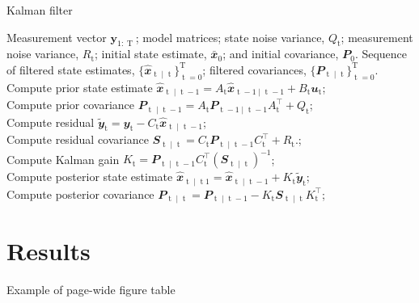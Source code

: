 \documentclass[twoside,twocolumn]{article}
\DeclareMathOperator{\td}{\mathrm{t}}
\DeclareMathOperator{\T}{\mathrm{T}}
\theoremstyle{mytheoremstyle}
\begin{document}
\begin{algorithm}[!t]
	\caption{Kalman filter}\label{alg:kf}
	\begin{algorithmic}[1]
		\renewcommand{\algorithmicrequire}{\textbf{Input:}}
		\renewcommand{\algorithmicensure}{\textbf{Output:}}
		\REQUIRE Measurement vector $\mathbf{y}_{1:\T}$; model matrices; state noise variance, $Q_{\td}$; measurement noise variance, $R_{\td}$; initial state estimate, $\bar{\mathbfit{x}}_0$; and initial covariance, $\mathbfit{P}_0$.
		\ENSURE Sequence of filtered state estimates, $\{\hat{\mathbfit{x}}_{\td \mid \td}\}^{\T}_{\td = 0}$; filtered covariances, $\{\mathbfit{P}_{\td \mid \td}\}^{\T}_{\td = 0}$.
		\FOR {$\td \gets 1,\T$}
		\STATE Compute prior state estimate $
		\hat{\mathbfit{x}}_{\td \mid \td-1} = A_{\td} \hat{\mathbfit{x}}_{\td-1 \mid \td-1} + B_{\td} \mathbfit{u}_{\td}$; \\	
		\STATE Compute prior covariance $
		\mathbfit{P}_{\td \mid \td-1} = A_{\td} \mathbfit{P}_{\td-1 \mid \td-1} A_{\td}^{\top} + Q_{\td}$;\\
		\STATE Compute residual $\tilde{\mathbfit{y}}_{\td} =\mathbfit{y}_{\td} - C_{\td} \hat{\mathbfit{x}}_{\td \mid \td-1}$; \\
		\STATE Compute residual covariance $ \mathbfit{S}_{\td \mid \td} = C_{\td} \mathbfit{P}_{\td \mid \td-1} C_{\td}^{\top} + R_{\td}.$; \\
		\STATE Compute Kalman gain $K_{\td} = \mathbfit{P}_{\td \mid \td-1} C_{\td}^{\top}\left(\mathbfit{S}_{\td \mid \td}\right)^{-1}$; \\
		\STATE Compute posterior state estimate $\hat{\mathbfit{x}}_{\td \mid \td1} = \hat{\mathbfit{x}}_{\td \mid \td-1}  + K_{\td} \tilde{\mathbfit{y}}_{\td}$; \\
		\STATE Compute posterior covariance $\mathbfit{P}_{\td \mid \td} = \mathbfit{P}_{\td \mid \td-1} - K_{\td}\mathbfit{S}_{\td \mid \td}K_{\td}^{\top}$; \\			
		\ENDFOR
	\end{algorithmic}
\end{algorithm}
\section{Results}

\begin{table}[t]
	\centering
	\caption{Example of page-wide figure table}
	\centering
	
\end{table}
\end{document}
